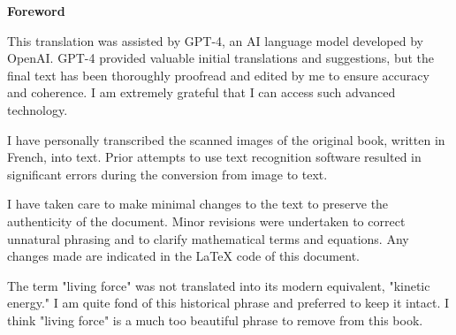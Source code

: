 \documentclass{book}
\makeatletter
\newcommand{\booksubtitle}{CONSIDERATIONS ON THE USE OF ENGINES AND THEIR EVALUATION, 
TO SERVE AS AN INTRODUCTION TO THE SPECIAL STUDY OF MACHINES}
\newcommand{\bookauthor}{\@author}
\makeatother
\begin{document}











\newpage
\thispagestyle{empty}
\vspace*{\fill}
\textbf{Foreword}
\setlength{\parindent}{20pt}
\vfill

This translation was assisted by GPT-4, an AI language model developed by OpenAI. GPT-4 provided valuable initial translations and suggestions, but the final text has been thoroughly proofread and edited by me to ensure accuracy and coherence. I am extremely grateful that I can access such advanced technology.

I have personally transcribed the scanned images of the original book, written in French, into text. Prior attempts to use text recognition software resulted in significant errors during the conversion from image to text. 

I have taken care to make minimal changes to the text to preserve the authenticity of the document. Minor revisions were undertaken to correct unnatural phrasing and to clarify mathematical terms and equations. Any changes made are indicated in the LaTeX code of this document.

The term "living force" was not translated into its modern equivalent, "kinetic energy." I am quite fond of this historical phrase and preferred to keep it intact. I think "living force" is a much too beautiful phrase to remove from this book. 
\end{document}
